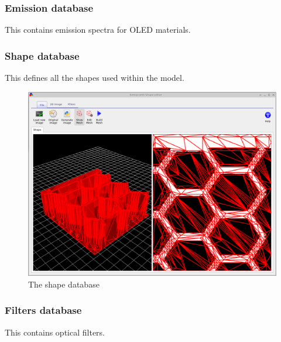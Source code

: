 \subsubsection{Emission database}
This contains emission spectra for OLED materials.

\subsubsection{Shape database}
This defines all the shapes used within the model.

\begin{figure}[H]
\centering
\includegraphics[width=\textwidth,height=0.7\textwidth]{./images/shape_db.png}
\caption{The shape database}
\label{fig:shapedb}
\end{figure}

\subsubsection{Filters database}
This contains optical filters.

